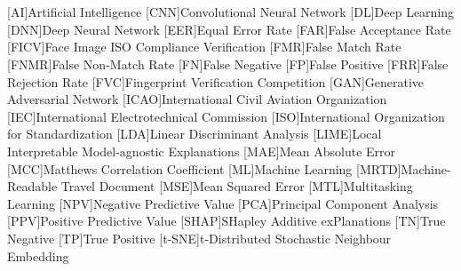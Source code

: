 \section*{} 

\begin{acronym}[FNMR]
[AI]{Artificial Intelligence}
[CNN]{Convolutional Neural Network}
[DL]{Deep Learning}
[DNN]{Deep Neural Network}
[EER]{Equal Error Rate}
[FAR]{False Acceptance Rate}
[FICV]{Face Image ISO Compliance Verification}
[FMR]{False Match Rate}
[FNMR]{False Non-Match Rate}
[FN]{False Negative}
[FP]{False Positive}
[FRR]{False Rejection Rate}
[FVC]{Fingerprint Verification Competition}
[GAN]{Generative Adversarial Network}
[ICAO]{International Civil Aviation Organization}
[IEC]{International Electrotechnical Commission}
[ISO]{International Organization for Standardization}
[LDA]{Linear Discriminant Analysis}
[LIME]{Local Interpretable Model-agnostic Explanations}
[MAE]{Mean Absolute Error}
[MCC]{Matthews Correlation Coefficient}
[ML]{Machine Learning}
[MRTD]{Machine-Readable Travel Document}
[MSE]{Mean Squared Error}
[MTL]{Multitasking Learning}
[NPV]{Negative Predictive Value}
[PCA]{Principal Component Analysis}
[PPV]{Positive Predictive Value}
[SHAP]{SHapley Additive exPlanations}
[TN]{True Negative}
[TP]{True Positive}
[t-SNE]{t-Distributed Stochastic Neighbour Embedding}
\end{acronym}

